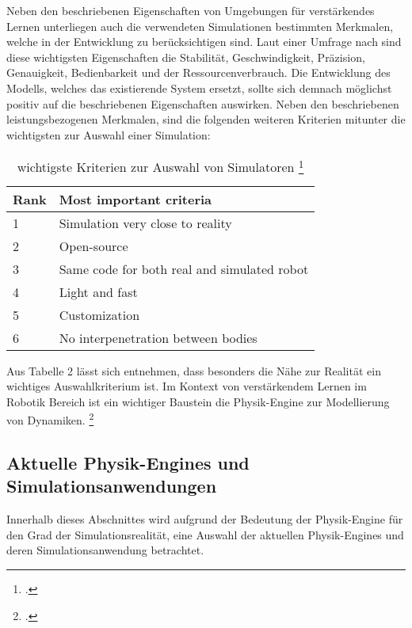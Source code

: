 Neben den beschriebenen Eigenschaften von Umgebungen für verstärkendes Lernen unterliegen auch die verwendeten Simulationen bestimmten Merkmalen, welche in der Entwicklung zu berücksichtigen sind.
Laut einer Umfrage nach \cite[]{Ivaldi.2272014} sind diese wichtigsten Eigenschaften die Stabilität, Geschwindigkeit, Präzision, Genauigkeit, Bedienbarkeit und der Ressourcenverbrauch.
Die Entwicklung des Modells, welches das existierende System ersetzt, sollte sich demnach möglichst positiv auf die beschriebenen Eigenschaften auswirken.
Neben den beschriebenen leistungsbezogenen Merkmalen, sind die folgenden weiteren Kriterien mitunter die wichtigsten zur Auswahl einer Simulation:

\begin{table}[H]
    \centering
    \begin{tabular}{|l|l|}
    \hline
    Rank & Most important criteria                     \\ \hline
    1    & Simulation very close to reality            \\
    2    & Open-source                                 \\
    3    & Same code for both real and simulated robot \\
    4    & Light and fast                              \\
    5    & Customization                               \\
    6    & No interpenetration between bodies          \\ \hline
    \end{tabular}
    \caption{wichtigste Kriterien zur Auswahl von Simulatoren \footcite[][S. 4]{Ivaldi.2272014}}
    \label{tab:important-criteria}
\end{table}

Aus Tabelle 2 lässt sich entnehmen, dass besonders die Nähe zur Realität ein wichtiges Auswahlkriterium ist.
Im Kontext von verstärkendem Lernen im Robotik Bereich ist ein wichtiger Baustein die Physik-Engine zur Modellierung von Dynamiken. \footcite[Vgl.][S. 2]{Ayala.2020}

\subsection{Aktuelle Physik-Engines und Simulationsanwendungen}
Innerhalb dieses Abschnittes wird aufgrund der Bedeutung der Physik-Engine für den Grad der Simulationsrealität, eine Auswahl der aktuellen Physik-Engines und deren Simulationsanwendung betrachtet.

